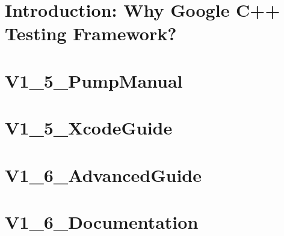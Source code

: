 \documentclass[twoside]{book}
\newcommand{\+}{\discretionary{\mbox{\scriptsize$\hookleftarrow$}}{}{}}
\begin{document}
\chapter{Introduction\+: Why Google C++ Testing Framework?}
\label{md_smacc_sm_reference_library_sm_panda_moveit_libfranka_3rdparty_googletest_googletest_docs_V1_5_Primer}

\chapter{V1\+\_\+5\+\_\+\+Pump\+Manual}
\label{md_smacc_sm_reference_library_sm_panda_moveit_libfranka_3rdparty_googletest_googletest_docs_V1_5_PumpManual}

\chapter{V1\+\_\+5\+\_\+\+Xcode\+Guide}
\label{md_smacc_sm_reference_library_sm_panda_moveit_libfranka_3rdparty_googletest_googletest_docs_V1_5_XcodeGuide}

\chapter{V1\+\_\+6\+\_\+\+Advanced\+Guide}
\label{md_smacc_sm_reference_library_sm_panda_moveit_libfranka_3rdparty_googletest_googletest_docs_V1_6_AdvancedGuide}

\chapter{V1\+\_\+6\+\_\+\+Documentation}
\label{md_smacc_sm_reference_library_sm_panda_moveit_libfranka_3rdparty_googletest_googletest_docs_V1_6_Documentation}

\end{document}
